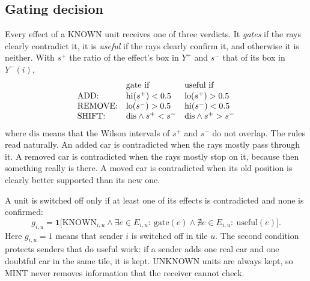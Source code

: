 \documentclass[conference]{IEEEtran}
\newcommand{\mint}{MINT}
\begin{document}
\subsection{Gating decision}
\label{sec:gate}
Every effect of a KNOWN unit receives one of three verdicts. It \emph{gates} if the rays clearly contradict it,
it is \emph{useful} if the rays clearly confirm it, and otherwise it is neither. With $s^{+}$ the ratio of the
effect's box in $Y^{+}$ and $s^{-}$ that of its box in $Y^{-}(i)$,
\begin{equation}
\begin{array}{@{}lll@{}}
 & \text{gate if} & \text{useful if}\\[1pt]
\text{ADD:} & \mathrm{hi}(s^{+})<0.5 & \mathrm{lo}(s^{+})>0.5\\
\text{REMOVE:} & \mathrm{lo}(s^{-})>0.5 & \mathrm{hi}(s^{-})<0.5\\
\text{SHIFT:} & \mathrm{dis}\land s^{+}<s^{-} & \mathrm{dis}\land s^{+}>s^{-}
\end{array}
\label{eq:gate}
\end{equation}
where $\mathrm{dis}$ means that the Wilson intervals of $s^{+}$ and $s^{-}$ do not overlap. The rules read
naturally. An added car is contradicted when the rays mostly pass through it. A removed car is contradicted
when the rays mostly stop on it, because then something really is there. A moved car is contradicted when its
old position is clearly better supported than its new one.

A unit is switched off only if at least one of its effects is contradicted and none is confirmed:
\begin{equation}
g_{i,u}=\mathbf{1}\big[\mathrm{KNOWN}_{i,u}\land \exists e{\in}E_{i,u}{:}\ \mathrm{gate}(e)
\land \nexists e{\in}E_{i,u}{:}\ \mathrm{useful}(e)\big].
\label{eq:unitgate}
\end{equation}
Here $g_{i,u}=1$ means that sender $i$ is switched off in tile $u$. The second condition protects senders that
do useful work: if a sender adds one real car and one doubtful car in the same tile, it is kept. UNKNOWN units are
always kept, so \mint{} never removes information that the receiver cannot check.
\end{document}
